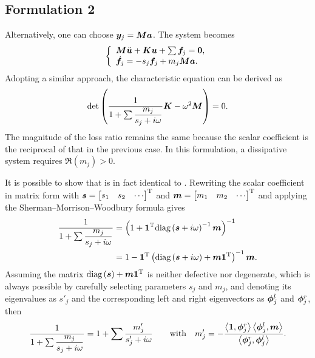 \subsection{Formulation 2}\label{sec:a_dep}
Alternatively, one can choose $\bm{y}_j=\bm{M}\bm{a}$.
The system becomes
\begin{gather}
    \left\{\begin{array}{l}
        \bm{M}\ddot{\bm{u}}+\bm{K}\bm{u}+\sum\bm{f}_j=\bm{0}, \\
        \dot{\bm{f}}_j=-s_j\bm{f}_j+m_j\bm{M}\bm{a}.
    \end{array}\right.
\end{gather}
Adopting a similar approach, the characteristic equation can be derived as
\begin{gather}\label{eq:acc_cha}
    \det\left(\dfrac{1}{1+\sum\dfrac{m_j}{s_j+i\omega}}\bm{K}-\omega^2\bm{M}\right)=0.
\end{gather}
The magnitude of the loss ratio remains the same because the scalar coefficient is the reciprocal of that in the previous case.
In this formulation, a dissipative system requires $\Re\left(m_j\right)>0$.

It is possible to show that  is in fact identical to .
Rewriting the scalar coefficient in matrix form with $\bm{s}=\begin{bmatrix}
        s_1 & s_2 & \cdots
    \end{bmatrix}^{\mathrm{T}}$ and $\bm{m}=\begin{bmatrix}
        m_1 & m_2 & \cdots
    \end{bmatrix}^{\mathrm{T}}$ and applying the Sherman--Morrison--Woodbury formula gives
\begin{gather}
    \begin{split}
        \dfrac{1}{1+\sum\dfrac{m_j}{s_j+i\omega}} & =\left(1+\bm{1}^{\mathrm{T}}\text{diag}\left(\bm{s}+i\omega\right)^{-1}\bm{m}\right)^{-1} \\&=1-\bm{1}^{\mathrm{T}}\left(\text{diag}\left(\bm{s}+i\omega\right)+\bm{m}\bm{1}^{\mathrm{T}}\right)^{-1}\bm{m}.
    \end{split}
\end{gather}
Assuming the matrix $\text{diag}\left(\bm{s}\right)+\bm{m}\bm{1}^{\mathrm{T}}$ is neither defective nor degenerate, which is always possible by carefully selecting parameters $s_j$ and $m_j$, and denoting its eigenvalues as $s'_j$ and the corresponding left and right eigenvectors as $\bm{\phi}^l_j$ and $\bm{\phi}^r_j$, then
\begin{gather}
    \dfrac{1}{1+\sum\dfrac{m_j}{s_j+i\omega}}=1+\sum\dfrac{m'_j}{s_j'+i\omega}\qquad\text{with}\quad{}m'_j=-\dfrac{\left\langle\bm{1},\bm{\phi}^r_j\right\rangle\left\langle\bm{\phi}^l_j,\bm{m}\right\rangle}{\left\langle\bm{\phi}^r_j,\bm{\phi}^l_j\right\rangle}.
\end{gather}

